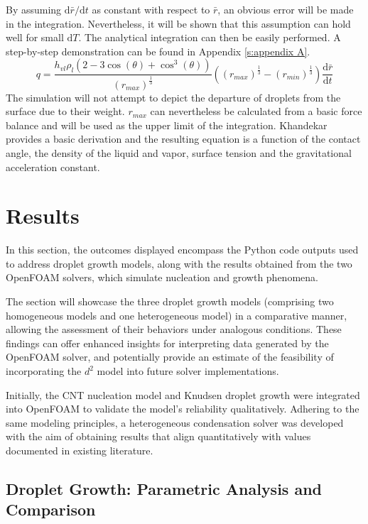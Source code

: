 \documentclass[12pt]{article}
\numberwithin{equation}{section}
\begin{document}
By assuming $\mathrm{d}\bar{r}/\mathrm{d}t$ as constant with respect to $\bar{r}$, an obvious error will be made in the integration. Nevertheless, it will be shown that this assumption can hold well for small $\mathrm{d}T$. The analytical integration can then be easily performed. A step-by-step demonstration can be found in Appendix \ref{s:appendix A}.
\begin{equation}\label{eq:wall_heat_flux_analytical}
        q=\frac{h_{vl}\rho_{l}(2-3\cos(\theta)+\cos^{3}(\theta))}{(r_{max})^{\frac{1}{3}}}((r_{max})^{\frac{1}{3}}-(r_{min})^{\frac{1}{3}})\frac{\mathrm{d}\bar{r}}{\mathrm{d}t}
\end{equation}
The simulation will not attempt to depict the departure of droplets from the surface due to their weight. $r_{max}$ can nevertheless be calculated from a basic force balance and will be used as the upper limit of the integration. Khandekar \cite{khandekar2020drop} provides a basic derivation and the resulting equation is a function of the contact angle, the density of the liquid and vapor, surface tension and the gravitational acceleration constant. 


\newpage
\section{Results}\label{s:Results}
In this section, the outcomes displayed encompass the Python code outputs used to address droplet growth models, along with the results obtained from the two OpenFOAM solvers, which simulate nucleation and growth phenomena.

The section will showcase the three droplet growth models (comprising two homogeneous models and one heterogeneous model) in a comparative manner, allowing the assessment of their behaviors under analogous conditions. These findings can offer enhanced insights for interpreting data generated by the OpenFOAM solver, and potentially provide an estimate of the feasibility of incorporating the $d^2$ model into future solver implementations.

Initially, the CNT nucleation model and Knudsen droplet growth were integrated into OpenFOAM to validate the model's reliability qualitatively. Adhering to the same modeling principles, a heterogeneous condensation solver was developed with the aim of obtaining results that align quantitatively with values documented in existing literature.  
\subsection{Droplet Growth: Parametric Analysis and Comparison}\label{ss:Dropwise-D2-Knudsen}
\end{document}
